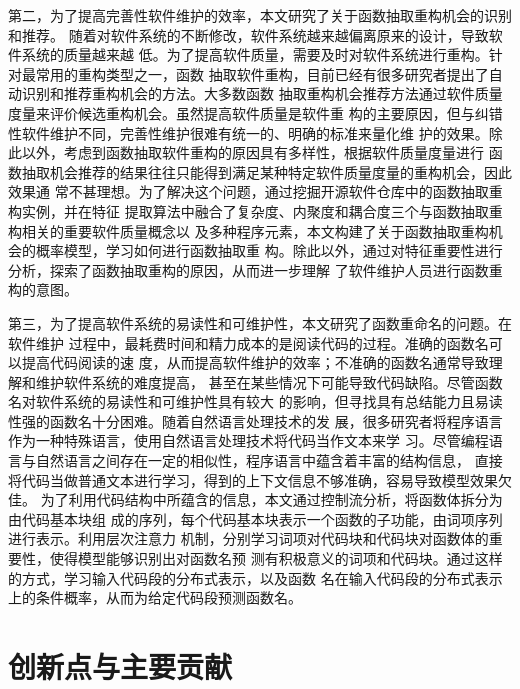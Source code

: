 第二，为了提高完善性软件维护的效率，本文研究了关于函数抽取重构机会的识别和推荐。
随着对软件系统的不断修改，软件系统越来越偏离原来的设计，导致软件系统的质量越来越
低。为了提高软件质量，需要及时对软件系统进行重构。针对最常用的重构类型之一，函数
抽取软件重构，目前已经有很多研究者提出了自动识别和推荐重构机会的方法。大多数函数
抽取重构机会推荐方法通过软件质量度量来评价候选重构机会。虽然提高软件质量是软件重
构的主要原因，但与纠错性软件维护不同，完善性维护很难有统一的、明确的标准来量化维
护的效果。除此以外，考虑到函数抽取软件重构的原因具有多样性，根据软件质量度量进行
函数抽取机会推荐的结果往往只能得到满足某种特定软件质量度量的重构机会，因此效果通
常不甚理想。为了解决这个问题，通过挖掘开源软件仓库中的函数抽取重构实例，并在特征
提取算法中融合了复杂度、内聚度和耦合度三个与函数抽取重构相关的重要软件质量概念以
及多种程序元素，本文构建了关于函数抽取重构机会的概率模型，学习如何进行函数抽取重
构。除此以外，通过对特征重要性进行分析，探索了函数抽取重构的原因，从而进一步理解
了软件维护人员进行函数重构的意图。

第三，为了提高软件系统的易读性和可维护性，本文研究了函数重命名的问题。在软件维护
过程中，最耗费时间和精力成本的是阅读代码的过程。准确的函数名可以提高代码阅读的速
度，从而提高软件维护的效率；不准确的函数名通常导致理解和维护软件系统的难度提高，
甚至在某些情况下可能导致代码缺陷。尽管函数名对软件系统的易读性和可维护性具有较大
的影响，但寻找具有总结能力且易读性强的函数名十分困难。随着自然语言处理技术的发
展，很多研究者将程序语言作为一种特殊语言，使用自然语言处理技术将代码当作文本来学
习。尽管编程语言与自然语言之间存在一定的相似性，程序语言中蕴含着丰富的结构信息，
直接将代码当做普通文本进行学习，得到的上下文信息不够准确，容易导致模型效果欠佳。
为了利用代码结构中所蕴含的信息，本文通过控制流分析，将函数体拆分为由代码基本块组
成的序列，每个代码基本块表示一个函数的子功能，由词项序列进行表示。利用层次注意力
机制，分别学习词项对代码块和代码块对函数体的重要性，使得模型能够识别出对函数名预
测有积极意义的词项和代码块。通过这样的方式，学习输入代码段的分布式表示，以及函数
名在输入代码段的分布式表示上的条件概率，从而为给定代码段预测函数名。

\section{创新点与主要贡献}

